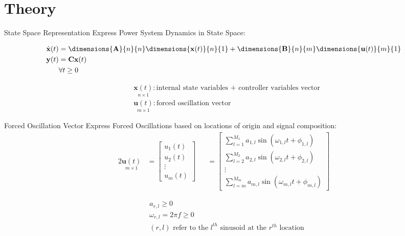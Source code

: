 \section[Theory]{Theory}
\label{sec:lasso_theory}

\begin{frame}[fragile]{State Space Representation}
	Express Power System Dynamics in State Space:

	\begin{align}
		\dot{\textbf{x}}(t) &= 
		\dimensions{\textbf{A}}{n}{n} \dimensions{\textbf{x}(t)}{n}{1}
		+ \dimensions{\textbf{B}}{n}{m} \dimensions{\textbf{u}(t)}{m}{1} \nonumber\\
		\textbf{y}(t) &= 
		\textbf{C}\textbf{x}(t)\\  
		& \forall t\geq0 \nonumber
	\end{align}
	
	\begin{align*}
		& \underset{\scriptscriptstyle n\times 1}{\textbf{x}(t)} : \text{internal state variables + controller variables vector}                                                                      \\
		& \underset{\scriptscriptstyle m\times 1}{\textbf{u}(t)} : \text{forced oscillation vector}
	\end{align*}
\end{frame}

\begin{frame}[fragile]{Forced Oscillation Vector}
	Express Forced Oscillations based on locations of origin and signal composition:
	\begin{alignat}{2}
		\underset{\scriptscriptstyle m\times 1}{\textbf{u}(t)} 
		&= 
		\begin{bmatrix}
			u_1(t) \\
			u_2(t) \\
			\vdots \\
			u_m(t)
		\end{bmatrix} 
		& &=
		\begin{bmatrix}
			\sum_{l=1}^{M_1} a_{1,l} \sin(\omega_{1,l}t + \phi_{1,l}) \\
			\sum_{l=2}^{M_2} a_{2,l} \sin(\omega_{2,l}t + \phi_{2,l}) \\
			\vdots \\
			\sum_{l=m}^{M_m} a_{m,l} \sin(\omega_{m,l}t + \phi_{m,l})
		\end{bmatrix} 
	\end{alignat}
	
	\begin{align*}
		& a_{r,l} \geq0 \\
		& \omega_{r,l} = 2\pi f \geq 0 \\
		& (r,l) \text{ refer to the } l^{th} \text{ sinusoid at the }  r^{th} \text{ location}
	\end{align*}

\end{frame}